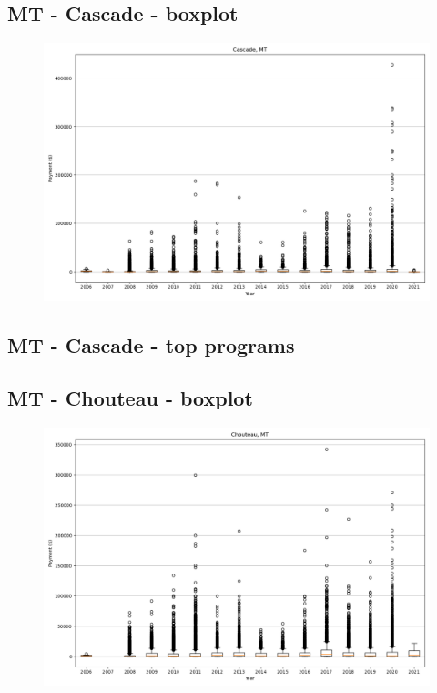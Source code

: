 \subsection*{MT - Cascade - boxplot}
\begin{figure}[h]
\centering
\includegraphics[width=7in]{../output/boxplots/counties/Cascade-MT_boxplot.png}
\end{figure}


\subsection*{MT - Cascade - top programs}

\newpage
\subsection*{MT - Chouteau - boxplot}
\begin{figure}[h]
\centering
\includegraphics[width=7in]{../output/boxplots/counties/Chouteau-MT_boxplot.png}
\end{figure}


